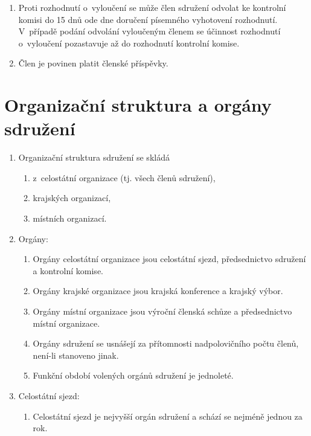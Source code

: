 \documentclass[a4paper]{article}
\begin{document}
\begin{enumerate}
    \item Proti rozhodnutí o~vyloučení se může člen sdružení odvolat ke
        kontrolní komisi do 15 dnů ode dne doručení písemného vyhotovení
        rozhodnutí. V~případě podání odvolání vyloučeným členem se účinnost
        rozhodnutí o~vyloučení pozastavuje až do rozhodnutí kontrolní komise.

    \item Člen je povinen platit členské příspěvky.
    \end{enumerate}



\section{Organizační struktura a orgány sdružení}
    \begin{enumerate}
    \item Organizační struktura sdružení se skládá
        \begin{enumerate}
        \item z~celostátní organizace (tj. všech členů sdružení),
        \item krajských organizací,
        \item místních organizací.
        \end{enumerate}

    \item Orgány:
        \begin{enumerate}
        \item Orgány celostátní organizace jsou celostátní sjezd, předsednictvo sdružení a kontrolní komise.
        \item Orgány krajské organizace jsou krajská konference a krajský výbor.
        \item Orgány místní organizace jsou výroční členská schůze a předsednictvo místní organizace.
        \item Orgány sdružení se usnášejí za přítomnosti nadpolovičního počtu členů, není-li stanoveno jinak.
        \item Funkční období volených orgánů sdružení je jednoleté.
        \end{enumerate}

    \item Celostátní sjezd:
        \begin{enumerate}
        \item Celostátní sjezd je nejvyšší orgán sdružení a schází se nejméně
            jednou za rok.


\end{enumerate}
\end{enumerate}
\end{document}
